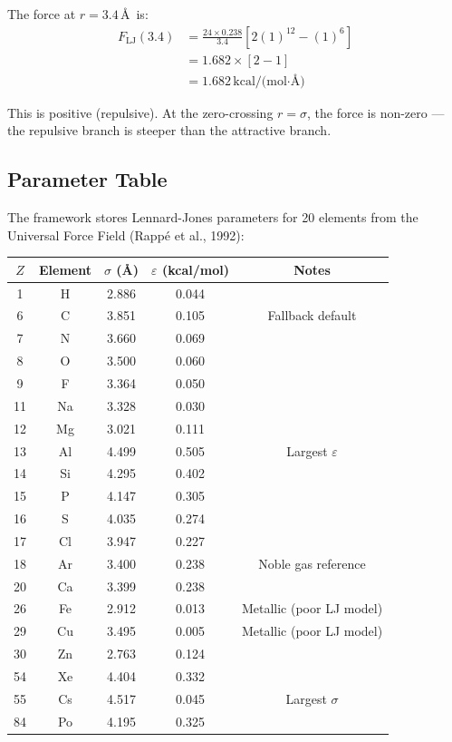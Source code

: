 \documentclass[11pt]{article}
\begin{document}
The force at $r = 3.4$\,\AA\ is:
\begin{align}
F_{\text{LJ}}(3.4) &= \frac{24 \times 0.238}{3.4} \left[2(1)^{12} - (1)^6\right] \\
&= 1.682 \times [2 - 1] \\
&= 1.682\,\text{kcal/(mol·\AA)}
\end{align}

This is positive (repulsive). At the zero-crossing $r = \sigma$, the force is non-zero — the repulsive branch is steeper than the attractive branch.

\subsection{Parameter Table}

The framework stores Lennard-Jones parameters for 20 elements from the Universal Force Field (Rappé et al., 1992):

\begin{center}
\small
\begin{tabular}{ccccc}
\toprule
$Z$ & Element & $\sigma$ (\AA) & $\varepsilon$ (kcal/mol) & Notes \\
\midrule
1 & H & 2.886 & 0.044 & \\
6 & C & 3.851 & 0.105 & Fallback default \\
7 & N & 3.660 & 0.069 & \\
8 & O & 3.500 & 0.060 & \\
9 & F & 3.364 & 0.050 & \\
11 & Na & 3.328 & 0.030 & \\
12 & Mg & 3.021 & 0.111 & \\
13 & Al & 4.499 & 0.505 & Largest $\varepsilon$ \\
14 & Si & 4.295 & 0.402 & \\
15 & P & 4.147 & 0.305 & \\
16 & S & 4.035 & 0.274 & \\
17 & Cl & 3.947 & 0.227 & \\
18 & Ar & 3.400 & 0.238 & Noble gas reference \\
20 & Ca & 3.399 & 0.238 & \\
26 & Fe & 2.912 & 0.013 & Metallic (poor LJ model) \\
29 & Cu & 3.495 & 0.005 & Metallic (poor LJ model) \\
30 & Zn & 2.763 & 0.124 & \\
54 & Xe & 4.404 & 0.332 & \\
55 & Cs & 4.517 & 0.045 & Largest $\sigma$ \\
84 & Po & 4.195 & 0.325 & \\
\bottomrule
\end{tabular}
\end{center}
\end{document}

